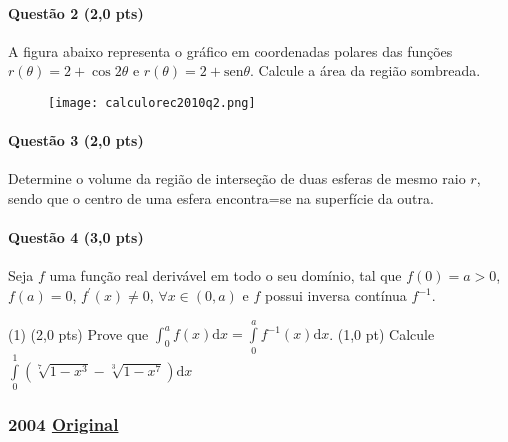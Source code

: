 \documentclass[12pt,a4paper]{article}
\newcommand{\sen}{\mathrm{sen}}
\newcommand{\dd}{\mathrm{d}}
\newcommand{\original}[1]{\tiny \href{#1}{Original} \normalsize}
\begin{document}
\paragraph{Questão 2 (2,0 pts)} A figura abaixo representa o gráfico em coordenadas polares das funções $r(\theta) = 2 + \cos 2\theta$ e $r(\theta) = 2 + \sen \theta$. Calcule a área da região sombreada.

\begin{figure}[h]
\centering
\texttt{[image: calculorec2010q2.png]}
\end{figure}

\paragraph{Questão 3 (2,0 pts)} Determine o volume da região de interseção de duas esferas de mesmo raio $r$, sendo que o centro de uma esfera encontra=se na superfície da outra.

\paragraph{Questão 4 (3,0 pts)} Seja $f$ uma função real derivável em todo o seu domínio, tal que $f(0) = a > 0$, $f(a) = 0$, $f^{\prime}(x) \neq 0, \, \forall x \in (0,a)$ e $f$ possui inversa contínua $f^{-1}$.

\begin{tasks}(1)
\task (2,0 pts) Prove que $\displaystyle\int_0^a f(x) \dd x = \displaystyle\int\limits_0^a f^{-1}(x)\dd x$.
\task (1,0 pt) Calcule $\displaystyle \int \limits_0^1 (\sqrt[7]{1-x^3} - \sqrt[3]{1-x^7})\dd x$
\end{tasks}



\newpage
\subsubsection{2004 \original{https://drive.google.com/open?id=1cueDlzP6kdOGKXl_dUKGMJ2rdUi4_zSb}}
\end{document}
